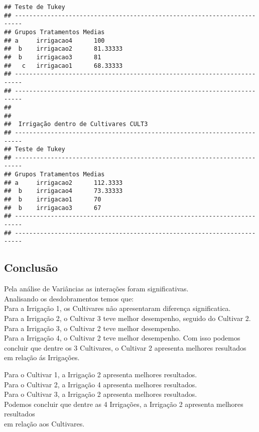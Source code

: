 \documentclass[
]{article}
\begin{document}
\begin{verbatim}
## Teste de Tukey
## ------------------------------------------------------------------------
## Grupos Tratamentos Medias
## a     irrigacao4      100 
##  b    irrigacao2      81.33333 
##  b    irrigacao3      81 
##   c   irrigacao1      68.33333 
## ------------------------------------------------------------------------
## ------------------------------------------------------------------------
## 
## 
##  Irrigação dentro de Cultivares CULT3
## ------------------------------------------------------------------------
## Teste de Tukey
## ------------------------------------------------------------------------
## Grupos Tratamentos Medias
## a     irrigacao2      112.3333 
##  b    irrigacao4      73.33333 
##  b    irrigacao1      70 
##  b    irrigacao3      67 
## ------------------------------------------------------------------------
## ------------------------------------------------------------------------
\end{verbatim}

\hypertarget{conclusuxe3o}{%
\subsection{Conclusão}\label{conclusuxe3o}}

Pela análise de Variâncias as interações foram significativas.\\
Analisando os desdobramentos temos que:\\
Para a Irrigação 1, os Cultivares não apresentaram diferença
significatica.\\
Para a Irrigação 2, o Cultivar 3 teve melhor desempenho, seguido do
Cultivar 2.\\
Para a Irrigação 3, o Cultivar 2 teve melhor desempenho.\\
Para a Irrigação 4, o Cultivar 2 teve melhor desempenho. Com isso
podemos concluir que dentre os 3 Cultivares, o Cultivar 2 apresenta
melhores resultados\\
em relação ás Irrigações.

Para o Cultivar 1, a Irrigação 2 apresenta melhores resultados.\\
Para o Cultivar 2, a Irrigação 4 apresenta melhores resultados.\\
Para o Cultivar 3, a Irrigação 2 apresenta melhores resultados.\\
Podemos concluir que dentre as 4 Irrigações, a Irrigação 2 apresenta
melhores resultados\\
em relação aos Cultivares.
\end{document}
